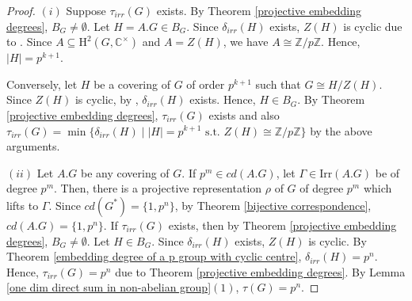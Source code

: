 \documentclass[a4paper,11pt]{amsart}
\numberwithin{equation}{section}
\numberwithin{equation}{subsection}
\newcommand{\C}{\mathbb{C}}
\newcommand{\Z}{\mathbb{Z}}
\newcommand{\irr}{\mathrm{Irr}}
\newcommand{\poonam}[1]{{\color{blue} #1}}
\begin{document}
\begin{proof}
$(i)$ Suppose $\tau_{irr}(G)$ exists. By Theorem \ref{projective embedding degrees}, $B_G \neq \emptyset$. Let $H= A.G \in B_G$. Since $\delta_{irr}(H)$ exists, $Z(H)$ is cyclic due to \cite[Theorem 2.32(a)]{isaacs}. Since $A \subseteq \mathrm{H}^2(G, \C^{\times})$ and $A = Z(H)$, we have $A \cong \Z/p\Z$. Hence, $|H|= p^{k+1}$.

Conversely, let $H$ be a covering of $G$ of order $p^{k+1}$ such that $G \cong H/Z(H)$. Since $Z(H)$ is cyclic, by \cite[Theorem 2.32(b)]{isaacs}, $\delta_{irr}(H)$ exists. Hence, $H \in B_G$. By Theorem \ref{projective embedding degrees}, $\tau_{irr}(G)$ exists and also $\tau_{irr}(G) = \min\{\delta_{irr}(H) \mid |H|= p^{k+1} \text{ s.t. } Z(H) \cong \Z/p\Z \}$ by the above arguments. %

$(ii)$ Let $A.G$ be any covering of $G$. If $p^m \in cd(A.G)$, let $\Gamma \in \irr(A.G)$ be of degree $p^m$. Then, there is a projective representation $\rho$ of $G$ of degree $p^m$ which lifts to $\Gamma$. Since $cd(G^*)=\{1, p^n\}$, by Theorem \ref{bijective correspondence}, $cd(A.G)=\{1, p^n\}$. If $\tau_{irr}(G)$ exists, then by Theorem \ref{projective embedding degrees}, $B_G \neq \emptyset$. Let $H \in B_G$. Since $\delta_{irr}(H)$ exists, $Z(H)$ is cyclic. By Theorem \ref{embedding degree of a p group with cyclic centre}, $\delta_{irr}(H)= p^n$. Hence, $\tau_{irr}(G) = p^n$ due to Theorem \ref{projective embedding degrees}. By Lemma \ref{one dim direct sum in non-abelian group}$(1)$, $\tau(G)= p^n$. %
\end{proof}


\end{document}
